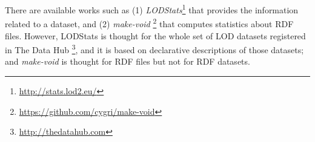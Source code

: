 There are available works such as (1) \emph{LODStats}\footnote{\footnotesize \url{http://stats.lod2.eu/}} that provides the information related to a dataset, and (2) \emph{make-void} \footnote{\footnotesize \url{https://github.com/cygri/make-void}} that computes statistics about RDF files. However, LODStats is thought for the whole set of LOD datasets registered in The Data Hub \footnote{\footnotesize \url{http://thedatahub.com}}, and it is based on declarative descriptions of those datasets; and \emph{make-void} is thought for RDF files but not for RDF datasets.
